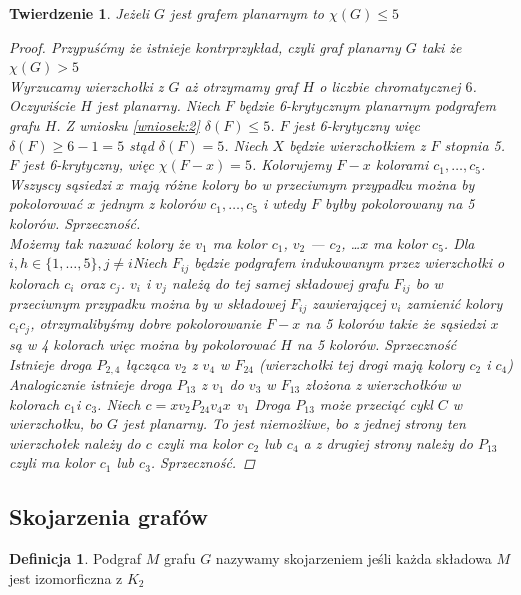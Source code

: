 \documentclass[12pt,a4paper]{article}
\newtheorem{tw}{Twierdzenie}
\theoremstyle{definition}
\newtheorem{df}{Definicja}
\begin{document}
\begin{tw}
Jeżeli $G$ jest grafem planarnym to $\chi(G) \leqslant 5$

\begin{proof}
Przypuśćmy że istnieje kontrprzykład, czyli graf planarny $G$ taki że $\chi(G) > 5$\\
Wyrzucamy wierzchołki z $G$ aż otrzymamy graf $H$ o liczbie chromatycznej $6$. Oczywiście $H$ jest planarny. Niech $F$ będzie 6-krytycznym planarnym podgrafem grafu $H$. Z wniosku \ref{wniosek:2} $\delta(F) \leqslant 5$. $F$ jest 6-krytyczny więc $\delta(F) \geqslant 6-1 = 5$ stąd $\delta(F) = 5$. Niech $X$ będzie wierzchołkiem z $F$ stopnia 5. $F$ jest 6-krytyczny, więc $\chi(F-x) = 5$. Kolorujemy $F-x$ kolorami $c_1,\dots,c_5$. Wszyscy sąsiedzi $x$ mają różne kolory bo w przeciwnym przypadku można by pokolorować $x$ jednym z kolorów $c_1,\dots,c_5$ i wtedy $F$ byłby pokolorowany na 5 kolorów. Sprzeczność.\\
Możemy tak nazwać kolory że $v_1$ ma kolor $c_1$, $v_2$ --- $c_2$, \dots $x$ ma kolor $c_5$. Dla $i,h\in \{1,\dots, 5\}, j\neq i$Niech $F_{ij}$ będzie podgrafem indukowanym przez wierzchołki o kolorach $c_i$ oraz $c_j$. 
$v_i$ i $v_j$ należą do tej samej składowej grafu $F_{ij}$ bo w przeciwnym przypadku można by w składowej $F_{ij}$ zawierającej $v_i$ zamienić kolory $c_ic_j$, otrzymalibyśmy dobre pokolorowanie $F-x$ na 5 kolorów takie że sąsiedzi $x$ są w 4 kolorach więc można by pokolorować $H$ na 5 kolorów. Sprzeczność\\
Istnieje droga $P_{2,4}$  łącząca $v_2$ z $v_4$ w $F_{24}$ (wierzchołki tej drogi mają kolory $c_2$  i $c_4$) Analogicznie istnieje droga $P_{13}$ z $v_1$ do $v_3$ w $F_{13}$ złożona z wierzchołków w kolorach $c_1$i $c_3$. Niech $c = xv_2P_{24}v_4x ~~ v_1$ %
Droga $P_{13}$ może przeciąć cykl $C$ w wierzchołku, bo $G$ jest planarny. To jest niemożliwe, bo z jednej strony ten wierzchołek należy do $c$ czyli ma kolor $c_2$ lub $c_4$ a z drugiej strony należy do $P_{13}$ czyli ma kolor $c_1$ lub $c_3$. Sprzeczność.
\end{proof}
\end{tw}

\subsection{Skojarzenia grafów}

\begin{df}
Podgraf $M$ grafu $G$ nazywamy skojarzeniem jeśli każda składowa $M$ jest izomorficzna z $K_2$
\end{df}
\end{document}
